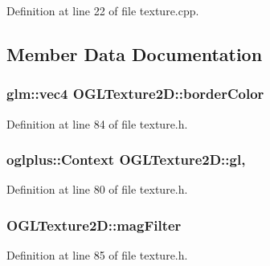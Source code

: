 Definition at line 22 of file texture.\+cpp.



\subsection{Member Data Documentation}
\hypertarget{class_o_g_l_texture2_d_ab49fd4b19ab6b299d99c128b90861e9d}{}
\subsubsection[{border\+Color}]{\setlength{\rightskip}{0pt plus 5cm}glm\+::vec4 O\+G\+L\+Texture2\+D\+::border\+Color\hspace{0.3cm}{\ttfamily [protected]}}\label{class_o_g_l_texture2_d_ab49fd4b19ab6b299d99c128b90861e9d}


Definition at line 84 of file texture.\+h.

\hypertarget{class_o_g_l_texture2_d_a53d4b615b88288938afb52730022d6a8}{}
\subsubsection[{gl}]{\setlength{\rightskip}{0pt plus 5cm}oglplus\+::\+Context O\+G\+L\+Texture2\+D\+::gl\hspace{0.3cm}{\ttfamily [static]}, {\ttfamily [protected]}}\label{class_o_g_l_texture2_d_a53d4b615b88288938afb52730022d6a8}


Definition at line 80 of file texture.\+h.

\hypertarget{class_o_g_l_texture2_d_abcc4f2fdc77667a1ff83d0f23b94fbdd}{}
\subsubsection[{mag\+Filter}]{ O\+G\+L\+Texture2\+D\+::mag\+Filter\hspace{0.3cm}{\ttfamily [protected]}}\label{class_o_g_l_texture2_d_abcc4f2fdc77667a1ff83d0f23b94fbdd}


Definition at line 85 of file texture.\+h.

